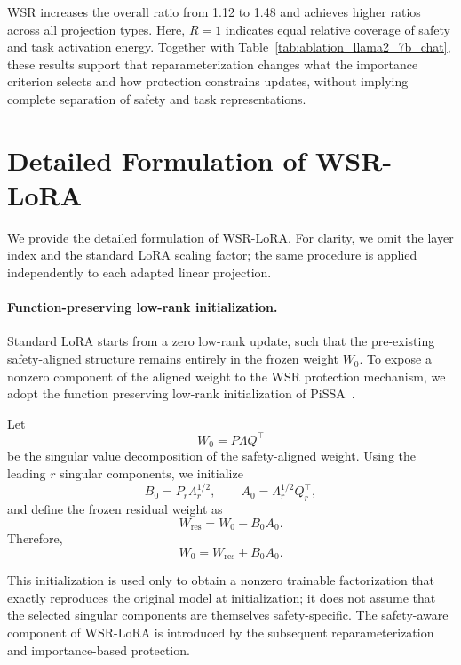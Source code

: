 \documentclass{article}
\begin{document}
WSR increases the overall ratio from 1.12 to 1.48 and achieves higher ratios across all projection types. Here, $R=1$ indicates equal relative coverage of safety and task activation energy. Together with Table~\ref{tab:ablation_llama2_7b_chat}, these results support that reparameterization changes what the importance criterion selects and how protection constrains updates, without implying complete separation of safety and task representations.




\section{Detailed Formulation of WSR-LoRA}
\label{app:wsr_lora}

We provide the detailed formulation of WSR-LoRA. For clarity, we omit the layer index and the standard LoRA scaling factor; the same procedure is applied independently to each adapted linear projection.

\paragraph{Function-preserving low-rank initialization.} Standard LoRA starts from a zero low-rank update, such that the pre-existing safety-aligned structure remains entirely in the frozen weight $W_0$. To expose a nonzero component of the aligned weight to the WSR protection mechanism, we adopt the function preserving low-rank initialization of PiSSA~\citep{pissa}.

Let
\begin{equation}
    W_0=P\Lambda Q^\top
\end{equation}
be the singular value decomposition of the safety-aligned weight.
Using the leading $r$ singular components, we initialize
\begin{equation}
    B_0=P_r\Lambda_r^{1/2},
    \qquad
    A_0=\Lambda_r^{1/2}Q_r^\top,
\end{equation}
and define the frozen residual weight as
\begin{equation}
    W_{\mathrm{res}}=W_0-B_0A_0.
\end{equation}
Therefore,
\begin{equation}
    W_0=W_{\mathrm{res}}+B_0A_0.
\end{equation}

This initialization is used only to obtain a nonzero trainable factorization that exactly reproduces the original model at initialization; it does not assume that the selected singular components are themselves safety-specific. The safety-aware component of WSR-LoRA is introduced by the subsequent reparameterization and importance-based protection.
\end{document}
